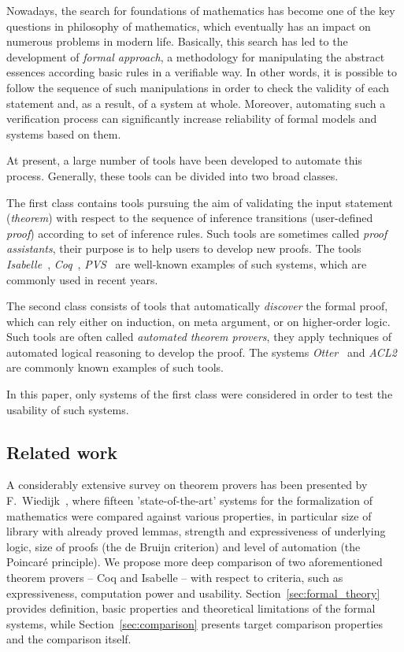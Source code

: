 \documentclass[article]{aaltoseries}
\begin{document}
Nowadays, the search for foundations of mathematics has become one of the key questions in philosophy of mathematics, which eventually has an impact on numerous problems in modern life. Basically, this search has led to the development of \textit{formal approach}, a methodology for manipulating the abstract essences according basic rules in a verifiable way. In other words, it is possible to follow the sequence of such manipulations in order to check the validity of each statement and, as a result, of a system at whole. Moreover, automating such a verification process can significantly increase reliability of formal models and systems based on them.

At present, a large number of tools have been developed to automate this process. Generally, these tools can be divided into two broad classes. 

The first class contains tools pursuing the aim of validating the input statement (\textit{theorem}) with respect to the sequence of inference transitions (user-defined \textit{proof}) according to set of inference rules. Such tools are sometimes called \textit{proof assistants}, their purpose is to help users to develop new proofs. The tools \textit{Isabelle}~\cite{tool_Isabelle}, \textit{Coq}~\cite{tool_Coq}, \textit{PVS}~\cite{tool_Pvs} are well-known examples of such systems, which are commonly used in recent years.

The second class consists of tools that automatically \textit{discover} the formal proof, which can rely either on induction, on meta argument, or on higher-order logic. Such tools are often called \textit{automated theorem provers}, they apply techniques of automated logical reasoning to develop the proof. The systems \textit{Otter}~\cite{tool_Otter} and \textit{ACL2}~\cite{tool_Acl} are commonly known examples of such tools.

In this paper, only systems of the first class were considered in order to test the usability of such systems.



\subsection{Related work}
A considerably extensive survey on theorem provers has been presented by F.~Wiedijk~\cite{Wie03}, where fifteen 'state-of-the-art' systems for the formalization of mathematics were compared against various properties, in particular size of library with already proved lemmas, strength and expressiveness of underlying logic, size of proofs (the de Bruijn criterion) and level of automation (the Poincaré principle). We propose more deep comparison of two aforementioned theorem provers -- Coq and Isabelle -- with respect to criteria, such as expressiveness, computation power and usability. Section~\ref{sec:formal_theory} provides definition, basic properties and theoretical limitations of the formal systems, while Section~\ref{sec:comparison} presents target comparison properties and the comparison itself.
\end{document}
